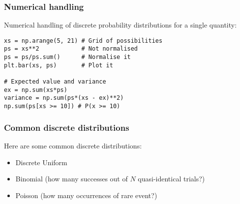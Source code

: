 \documentclass{beamer}
\begin{document}
\begin{frame}[t, fragile]
\frametitle{Numerical handling}
Numerical handling of discrete probability distributions for a single
quantity: \vspace{2em}

\begin{verbatim}
xs = np.arange(5, 21) # Grid of possibilities
ps = xs**2            # Not normalised
ps = ps/ps.sum()      # Normalise it
plt.bar(xs, ps)       # Plot it

# Expected value and variance
ex = np.sum(xs*ps) 
variance = np.sum(ps*(xs - ex)**2)
np.sum(ps[xs >= 10]) # P(x >= 10)
\end{verbatim}


\end{frame}




\begin{frame}[t, fragile]
\frametitle{Common discrete distributions}

Here are some common discrete distributions:

\begin{itemize}
\item <2-> Discrete Uniform
\item <3-> Binomial (how many successes out of $N$ quasi-identical trials?)
\item <4-> Poisson (how many occurrences of rare event?)
\end{itemize}

\end{frame}
\end{document}
